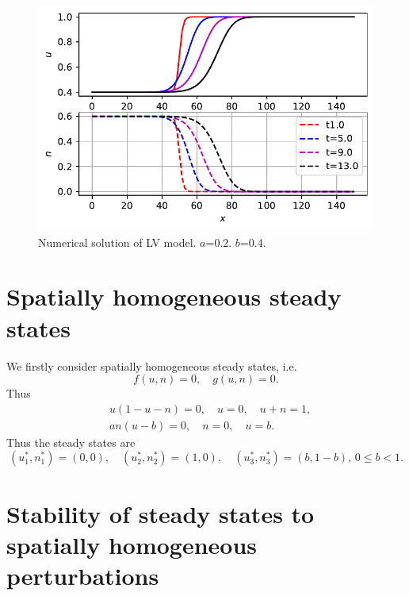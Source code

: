 \documentclass[
  letterpaper,
  DIV=11,
  numbers=noendperiod]{scrreprt}
\theoremstyle{definition}
\theoremstyle{plain}
\theoremstyle{plain}
\theoremstyle{remark}
\begin{document}
\begin{figure}

{\centering \includegraphics{LotkaVolteraPDE_files/figure-pdf/fig-lvpde-output-1.pdf}

}

\caption{\label{fig-lvpde}Numerical solution of LV model. \(a\)=0.2.
\(b\)=0.4.}

\end{figure}

\hypertarget{spatially-homogeneous-steady-states}{%
\section{Spatially homogeneous steady
states}\label{spatially-homogeneous-steady-states}}

We firstly consider spatially homogeneous steady states, i.e. \[
f(u,n) =0, \quad g(u,n) = 0.
\] Thus \[
\begin{aligned}
 &u(1-u-n) = 0,  \quad  u =0, \quad u+n=1,\\
 & an(u-b) = 0,  \quad n =0, \quad u =b.
 \end{aligned}
\] Thus the steady states are \[
 (u_1^\ast, n_1^\ast)= (0,0), \quad (u_2^\ast, n_2^\ast)= (1,0), \quad (u_3^\ast, n_3^\ast)= (b,1-b), \, 0\leq b <1.
\]

\hypertarget{stability-of-steady-states-to-spatially-homogeneous-perturbations}{%
\section{Stability of steady states to spatially homogeneous
perturbations}\label{stability-of-steady-states-to-spatially-homogeneous-perturbations}}
\end{document}
